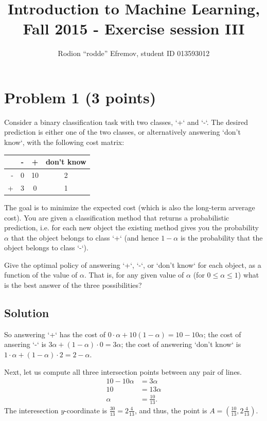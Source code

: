 \documentclass[10pt]{article}
\title{Introduction to Machine Learning, Fall 2015 - Exercise session III}
\author{Rodion ``rodde'' Efremov, student ID 013593012}
\begin{document}
 \maketitle

\section*{Problem 1 (3 points)}
\color{blue}
Consider a binary classification task with two classes, `+` and `-`. The desired prediction is either one of the two classes,  or alternatively answering `don't know`, with the following cost matrix:
\color{black}
\begin{center}
\begin{tabular}{r|c|c|c|}
 & - & + & don't know \\
\hline
- & 0 & 10 & 2 \\
\hline
+ & 3 & 0 & 1 \\
\hline
\end{tabular}
\end{center}
\color{blue}
The goal is to minimize the expected cost (which is also the long-term arverage cost). You are given a classification method that returns a probabilistic prediction, i.e. for each new object the existing method gives you the probability $\alpha$ that the object belongs to class `+` (and hence $1 - \alpha$ is the probability that the object belongs to class `-`).

\noindent Give the optimal policy of answering `+`, `-`, or `don't know` for each object, as a function of the value of $\alpha$. That is, for any given value of $\alpha$ (for $0 \leq \alpha \leq 1$) what is the best answer of the three possibilities?
\color{black}

\subsection*{Solution}
So answering `+` has the cost of $0 \cdot \alpha + 10 (1 - \alpha) = 10 - 10\alpha$; the cost of ansering `-` is $3\alpha + (1 - \alpha) \cdot 0 = 3\alpha$; the cost of answering `don't know` is $1 \cdot \alpha + (1 - \alpha) \cdot 2 = 2 - \alpha$.

Next, let us compute all three intersection points between any pair of lines.
\begin{align*}
10 - 10\alpha &= 3\alpha \\
10 &= 13\alpha \\
\alpha &= \frac{10}{13}.
\end{align*}
The interesection $y$-coordinate is $\frac{30}{13} = 2\frac{4}{13}$, and thus, the point is $A = (\frac{10}{13}, 2\frac{4}{13})$.
\end{document}
